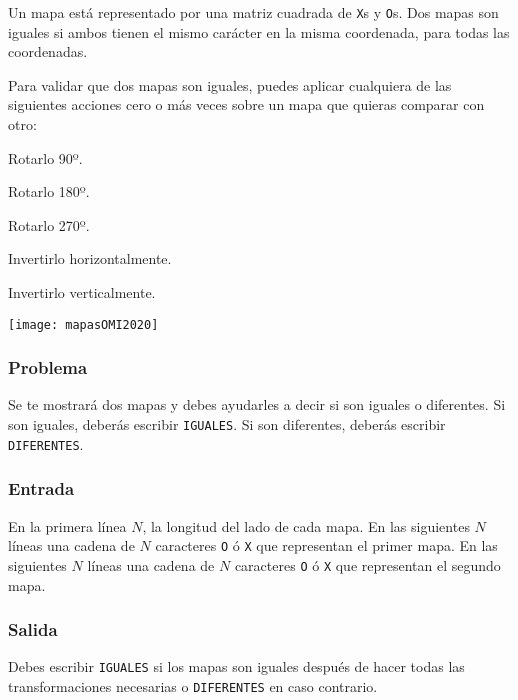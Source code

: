 Un mapa está representado por una matriz cuadrada de \verb|X|s y \verb|O|s. Dos mapas son iguales si ambos tienen el mismo carácter en la misma coordenada, para todas las coordenadas.

Para validar que dos mapas son iguales, puedes aplicar cualquiera de las siguientes acciones cero o más veces sobre un mapa que quieras comparar con otro:
\begin{plimits}
	\item Rotarlo 90º.
	\item Rotarlo 180º.
	\item Rotarlo 270º.
	\item Invertirlo horizontalmente.
	\item Invertirlo verticalmente.
\end{plimits}
\begin{center}
	\texttt{[image: mapasOMI2020]}
\end{center}

\subsubsection*{Problema}
Se te mostrará dos mapas y debes ayudarles a decir si son iguales o diferentes. Si son iguales, deberás escribir \verb|IGUALES|. Si son diferentes, deberás escribir \verb|DIFERENTES|.

\subsubsection*{Entrada}
En la primera línea \(N\), la longitud del lado de cada mapa. En las siguientes \(N\) líneas una cadena de \(N\) caracteres \verb|O| ó \verb|X| que representan el primer mapa. En las siguientes \(N\) líneas una cadena de \(N\) caracteres \verb|O| ó \verb|X| que representan el segundo mapa.
\subsubsection*{Salida}
Debes escribir \verb|IGUALES| si los mapas son iguales después de hacer todas las transformaciones necesarias o \verb|DIFERENTES| en caso contrario.

